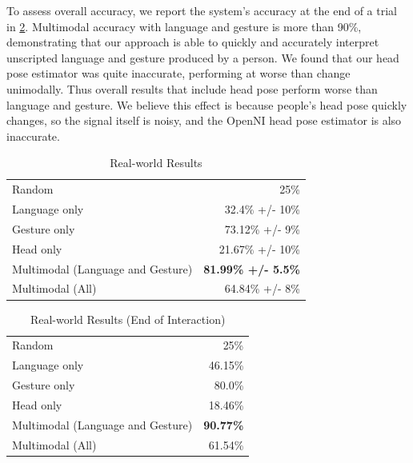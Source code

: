 \documentclass[letterpaper, 10 pt, conference]{ieeeconf}
\begin{document}
To assess overall accuracy, we report the system's accuracy at the end
of a trial in \ref{table:end_real}.  Multimodal accuracy with language
and gesture is more than 90\%, demonstrating that our approach is able
to quickly and accurately interpret unscripted language and gesture
produced by a person.  We found that our head pose estimator was quite
inaccurate, performing at worse than change unimodally.  Thus overall
results that include head pose perform worse than language and
gesture.  We believe this effect is because people's head pose quickly
changes, so the signal itself is noisy, and the OpenNI head pose
estimator is also inaccurate.

\begin{table}
\caption{Real-world Results\label{table:real_results}}
\centering
\begin{tabular}{lr}
\toprule
Random & 25\%\\
Language only &  32.4\% +/- 10\%\\
Gesture only  &  73.12\% +/- 9\%\\
Head only     &  21.67\% +/- 10\%\\
Multimodal (Language and Gesture) & {\bf 81.99\% +/- 5.5\%}\\
Multimodal (All) &  64.84\% +/- 8\%\\
\bottomrule
\end{tabular}
\end{table}
\begin{table}
\caption{Real-world Results (End of Interaction)\label{table:end_real}}
\centering
\begin{tabular}{lr}
\toprule
Random & 25\%\\
Language only &  46.15\%\\
Gesture only  &  80.0\%\\
Head only     & 18.46\%\\
Multimodal (Language and Gesture) & {\bf 90.77\%}\\
Multimodal (All) &  61.54\%\\
\bottomrule
\end{tabular}
\end{table}
\end{document}
